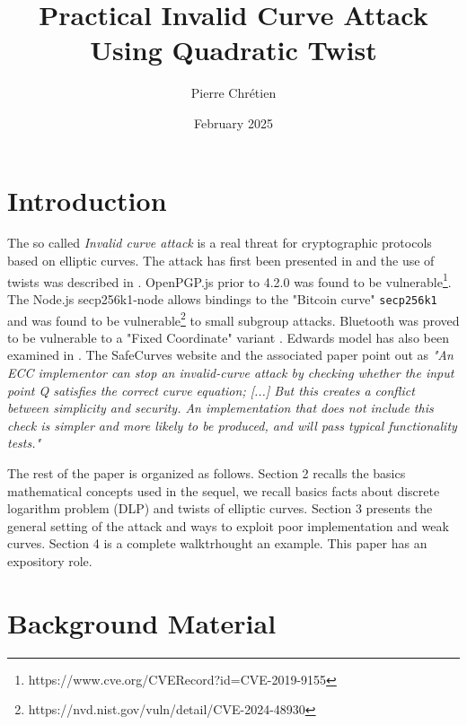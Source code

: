 \documentclass[10pt]{article}
\theoremstyle{definition}
\begin{document}

\author{Pierre Chrétien}
\title{Practical Invalid Curve Attack Using Quadratic Twist}
\date{February 2025}
\maketitle


\section{Introduction}

The so called \textsl{Invalid curve attack} is a real threat for cryptographic protocols based on elliptic curves.
The attack has first been presented in \cite{BMM00} and the use of twists was described in \cite{FLRV08}.
OpenPGP.js prior to 4.2.0 was found to be vulnerable\footnote{https://www.cve.org/CVERecord?id=CVE-2019-9155}. 
The Node.js secp256k1-node allows bindings to the  "Bitcoin curve" \verb|secp256k1| and was found to be vulnerable\footnote{https://nvd.nist.gov/vuln/detail/CVE-2024-48930} to small subgroup attacks.
Bluetooth was proved to be vulnerable to a "Fixed Coordinate" variant  \cite{cryptoeprint:2019/1043}.
Edwards model has also been examined in \cite{NT15}.
The SafeCurves website and the associated paper \cite{cryptoeprint:2024/1265} point out as 
\textsl{"An ECC implementor can stop an invalid-curve attack by checking whether the input point Q satisfies the correct curve equation; [...]
But this creates a conflict between simplicity and security. An implementation that does not include this check is simpler and more likely to be produced, and will pass typical functionality tests."}


The rest of the paper is organized as follows.
Section 2 recalls the basics mathematical concepts used  in the sequel, we recall basics facts about discrete logarithm problem (DLP) and twists of elliptic curves.	
Section 3 presents the general setting of the attack and ways to exploit poor implementation and weak curves.
Section 4 is a complete walktrhought an example.
This paper has an expository role.

\section{Background Material}
\end{document}
